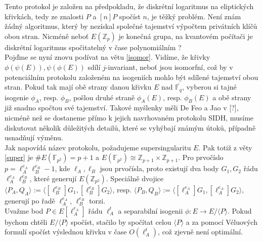 \documentclass [12pt]{report}
\begin{document}
Tento protokol je založen na předpokladu, že diskrétní logaritmus na eliptických křivkách, tedy ze znalosti $P$ a $[n]P$ spočíst $n$, je těžký problém. Není znám žádný algoritmus, který by nezískal společné tajemství výpočtem privátních klíčů obou stran. Nicméně neboť $E(\mathbb{Z}_p)$ je konečná grupa, na kvantovém počítači je diskrétní logaritmus spočitatelný v čase polynomiálním ?\\



Pojďme se nyní znovu podívat na větu \ref{isomor}.  Vidíme, že křivky $\phi (\psi (E)), \psi (\phi (E))$ sdílí $j$-invariant, neboť jsou isomorfní, což by v potenciálním protokolu založeném na isogeniích mohlo být sdílené tajemství obou stran. Pokud tak mají obě strany danou křivku $E$ nad $\overline{\mathbb{F}_q}$, vyberou si tajné isogenie $\phi_A$, resp. $\phi_B$, pošlou druhé straně $\phi_A(E)$, resp. $\phi_B(E)$ a obě strany již snadno spočtou své tajemství. Takové myšlenky měli De Feo a Jao v [?], nicméně než se dostaneme přímo k jejich navrhovaném protokolu SIDH, musíme diskutovat několik důležitých detailů, které se vyhýbají známým útoků, případně usnadňují výměnu.\\

Jak napovídá název protokolu, požadujeme supersingularitu $E$. Pak totiž z věty \ref{super} je $\#E(\mathbb{F}_{p^2}) = p+1$ a $E(\mathbb{F}_{p^2}) \cong \mathbb{Z}_{p+1} \times \mathbb{Z}_{p+1}$. Pro prvočíslo $p = \ell_A ^{e_A} \ell_B ^{e_B} - 1$, kde $\ell_A,\ell_B$ jsou prvočísla, proto existují dva body $G_1,G_2$ řádu $\ell_A ^{e_A} \ell_B ^{e_B}$, které generují $E(\mathbb{Z}_{p^2})$. Speciálně dvojice $\langle P_A, Q_A \rangle := \langle [\ell_B ^{e_B}]G_1, [\ell_B ^{e_B}]G_2 \rangle$, resp. $\langle P_B, Q_B \rangle := \langle  [\ell_A ^{e_A}]G_1, [\ell_A ^{e_A}]G_2 \rangle$, generují po řadě $\ell_A ^{e_A}$, $\ell_B ^{e_B}$ torzi.\\

Uvažme bod $P \in E[\ell_A ^{e_A}]$ řádu $\ell_A  ^t$ a separabilní isogenii $\phi : E \longrightarrow E/\langle P \rangle$. Pokud bychom chtěli $E/\langle P \rangle$ spočíst, stačilo by spočítat celou $\langle P \rangle$ a za pomocí Véluových formulí spočíst výslednou křivku v čase $O(\ell_A  ^t)$, což zjevně není optimální.
\end{document}
